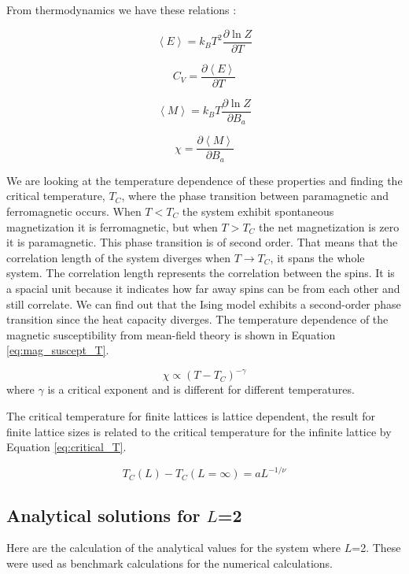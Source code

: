 From thermodynamics we have these relations \cite{thermal}:
\begin{multicols}{2}
\[
\left< E \right> = k_B T^2 \frac{\partial \ln Z}{\partial T}
\]

\[
C_V = \frac{\partial \left< E \right>  }{\partial T}
\]

\[
\left< M \right> = k_B T \frac{\partial \ln Z}{\partial B_a}
\]

\[
\chi = \frac{\partial \left< M \right>  }{\partial B_a}
\]
\end{multicols}
We are looking at the temperature dependence of these properties and finding the critical temperature, $T_C$,  where the phase transition between paramagnetic and ferromagnetic occurs. When $T< T_C$ the system exhibit spontaneous magnetization it is ferromagnetic, but when $T > T_C$ the net magnetization is zero it is paramagnetic. This phase transition is of second order. That means that the correlation length of the system diverges when $T \rightarrow T_C$, it spans the whole system. The correlation length represents the correlation between the spins. It is a spacial unit because it indicates how far away spins can be from each other and still correlate. We can find out that the Ising model exhibits a second-order phase transition since the heat capacity diverges. The temperature dependence of the magnetic susceptibility from mean-field theory is shown in Equation \ref{eq:mag_suscept_T}.

\begin{equation}\label{eq:mag_suscept_T}
\chi \propto (T-T_C)^{-\gamma}
\end{equation}
where $\gamma$ is a critical exponent and is different for different temperatures.

The critical temperature for finite lattices is lattice dependent, the result for finite lattice sizes is related to the critical temperature for the infinite lattice by Equation \ref{eq:critical_T}.

\begin{equation}\label{eq:critical_T}
T_C(L) - T_C(L=\infty) = a L^{-1/\nu}
\end{equation}

\subsection{Analytical solutions for $L$=2}\label{sec:analytical_sol}

Here are the calculation of the analytical values for the system where $L$=2. These were used as benchmark calculations for the numerical calculations.

